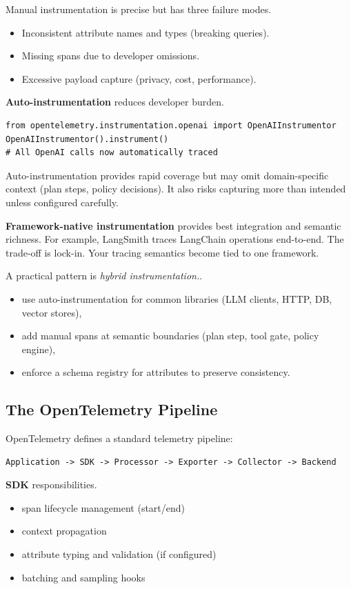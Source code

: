 Manual instrumentation is precise but has three failure modes.
\begin{itemize}
\item Inconsistent attribute names and types (breaking queries).
\item Missing spans due to developer omissions.
\item Excessive payload capture (privacy, cost, performance).
\end{itemize}

\textbf{Auto-instrumentation} reduces developer burden. {\footnotesize
\begin{verbatim}
from opentelemetry.instrumentation.openai import OpenAIInstrumentor
OpenAIInstrumentor().instrument()
# All OpenAI calls now automatically traced
\end{verbatim}
}

Auto-instrumentation provides rapid coverage but may omit domain-specific context (plan steps, policy decisions). It also risks capturing more than intended unless configured carefully.

\textbf{Framework-native instrumentation} provides best integration and semantic richness. For example, LangSmith traces LangChain operations end-to-end. The trade-off is lock-in. Your tracing semantics become tied to one framework.

A practical pattern is \emph{hybrid instrumentation.}.
\begin{itemize}
\item use auto-instrumentation for common libraries (LLM clients, HTTP, DB, vector stores),
\item add manual spans at semantic boundaries (plan step, tool gate, policy engine),
\item enforce a schema registry for attributes to preserve consistency.
\end{itemize}

\subsection{The OpenTelemetry Pipeline}

OpenTelemetry defines a standard telemetry pipeline:

{\footnotesize
\begin{verbatim}
Application -> SDK -> Processor -> Exporter -> Collector -> Backend
\end{verbatim}
}

\textbf{SDK} responsibilities.
\begin{itemize}
\item span lifecycle management (start/end)
\item context propagation
\item attribute typing and validation (if configured)
\item batching and sampling hooks
\end{itemize}

